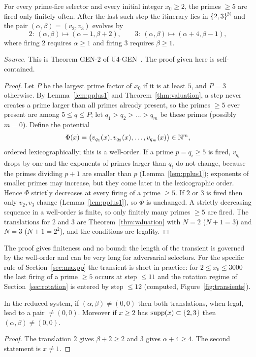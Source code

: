 \begin{theorem}\label{thm:A}
For every prime-fire selector and every initial integer $x_0\ge2$, the primes $\ge5$ are fired only finitely often. After the last such step the itinerary lies in $\{2,3\}^{\mathbb{N}}$ and the pair $(\alpha,\beta)=(v_2,v_3)$ evolves by
\[
2:\ (\alpha,\beta)\mapsto(\alpha-1,\beta+2),\qquad
3:\ (\alpha,\beta)\mapsto(\alpha+4,\beta-1),
\]
where firing $2$ requires $\alpha\ge1$ and firing $3$ requires $\beta\ge1$.
\end{theorem}
\noindent\emph{Source.} This is Theorem GEN-2 of U4-GEN~\cite{u4gen}. The proof given here is self-contained.
\begin{proof}
Let $P$ be the largest prime factor of $x_0$ if it is at least $5$, and $P=3$ otherwise. By Lemma~\ref{lem:pplus1} and Theorem~\ref{thm:valuation}, a step never creates a prime larger than all primes already present, so the primes $\ge5$ ever present are among $5\le q\le P$; let $q_1>q_2>\dots>q_m$ be these primes (possibly $m=0$). Define the potential
\[
\Phi(x)=\bigl(v_{q_1}(x),v_{q_2}(x),\dots,v_{q_m}(x)\bigr)\in\mathbb{N}^m,
\]
ordered lexicographically; this is a well-order. If a prime $p=q_i\ge5$ is fired, $v_{q_i}$ drops by one and the exponents of primes larger than $q_i$ do not change, because the primes dividing $p+1$ are smaller than $p$ (Lemma~\ref{lem:pplus1}); exponents of smaller primes may increase, but they come later in the lexicographic order. Hence $\Phi$ strictly decreases at every firing of a prime $\ge5$. If $2$ or $3$ is fired then only $v_2,v_3$ change (Lemma~\ref{lem:pplus1}), so $\Phi$ is unchanged. A strictly decreasing sequence in a well-order is finite, so only finitely many primes $\ge5$ are fired. The translations for $2$ and $3$ are Theorem~\ref{thm:valuation} with $N=2$ ($N+1=3$) and $N=3$ ($N+1=2^2$), and the conditions are legality. \end{proof}
The proof gives finiteness and no bound: the length of the transient is governed by the well-order and can be very long for adversarial selectors.
For the specific rule of Section~\ref{sec:maxpp} the transient is short in practice: for $2\le x_0\le3000$ the last firing of a prime $\ge5$ occurs at step $\le11$ and the rotation regime of Section~\ref{sec:rotation} is entered by step $\le12$ (computed, Figure~\ref{fig:transients}).

\begin{lemma}\label{lem:no00}
In the reduced system, if $(\alpha,\beta)\ne(0,0)$ then both translations, when legal, lead to a pair $\ne(0,0)$. Moreover if $x\ge2$ has $\operatorname{supp}(x)\subset\{2,3\}$ then $(\alpha,\beta)\ne(0,0)$.
\end{lemma}
\begin{proof} The translation $2$ gives $\beta+2\ge2$ and $3$ gives $\alpha+4\ge4$. The second statement is $x\ne1$. \end{proof}

